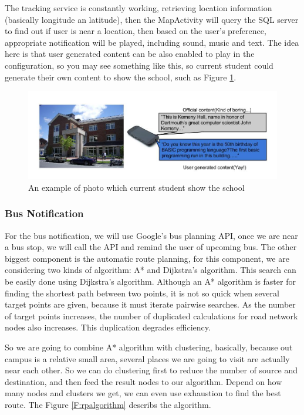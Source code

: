 \documentclass{article}
\begin{document}
The tracking service is constantly working, retrieving location information (basically longitude an latitude), then the MapActivity will query the SQL server to find out if user is near a location, then based on the user’s preference, appropriate notification will be played, including sound, music and text. The idea here is that user generated content can be also enabled to play in the configuration, so you may see something like this, so current student could generate their own content to show the school, such as Figure \ref{F:fig1}.

\begin{figure}[h!]   
\centering
\includegraphics[width = \textwidth]{figures/Fig1.jpg}
\caption{An example of photo which current student show the school}
\label{F:fig1}
\end{figure}


\subsubsection{Bus Notification}
For the bus notification, we will use Google’s bus planning API, once we are near a bus stop, we will call the API and remind the user of upcoming bus. 
The other biggest component is the automatic route planning, for this component, we are considering two kinds of algorithm: A* and Dijkstra’s algorithm. This search can be easily done using Dijkstra’s algorithm. Although an A* algorithm is faster for finding the shortest path between two points, it is not so quick when several target points are given, because it must iterate pairwise searches. As the number of target points increases, the number of duplicated calculations for road network nodes also increases. This duplication degrades efficiency.

So we are going to combine A* algorithm with clustering\cite{htoo2012}, basically, because out campus is a relative small area, several places we are going to visit are actually near each other. So we can do clustering first to reduce the number of source and destination, and then feed the result nodes to our algorithm. Depend on how many nodes and clusters we get, we can even use exhaustion to find the best route. The Figure \ref{F:rpalgorithm} describs the algorithm.
\end{document}
